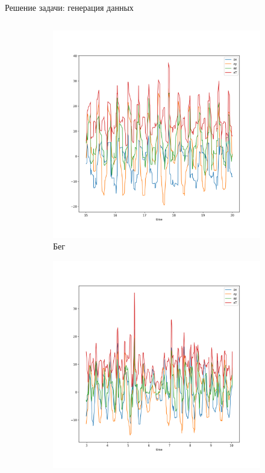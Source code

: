 \documentclass{beamer}
\begin{document}
\begin{frame}{Решение задачи: генерация данных}
\begin{columns}
\begin{column}{.6\textwidth}
\begin{figure}
\begin{subfigure}[b]{0.4\textwidth}
                    \includegraphics[width=\linewidth]{../pics/raw_run.png}
                    \caption{Бег}
                \end{subfigure}
                \begin{subfigure}[b]{0.4\textwidth}
                    \centering
                    \includegraphics[width=\linewidth]{../pics/raw_go_up.png}

\end{subfigure}
\end{figure}
\end{column}
\end{columns}
\end{frame}
\end{document}
